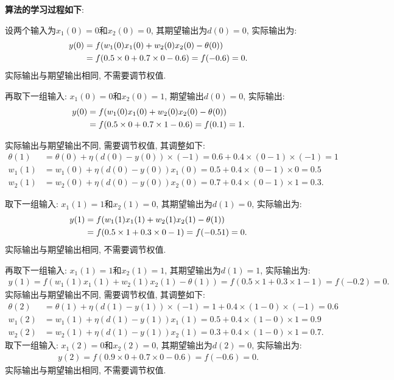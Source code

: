 \textbf{算法的学习过程如下}:

设两个输入为$x_1 (0)=0$和$x_2 (0)=0$, 其期望输出为$d (0)=0$, 实际输出为:
\begin{align*}
y (0)&=f (w_1 (0)x_1 (0)+ w_2 (0)x_2 (0)-\theta (0))\notag\\
     &=f (0.5\times 0+0.7\times 0-0.6)=f (-0.6)=0.
\end{align*}
实际输出与期望输出相同, 不需要调节权值.

再取下一组输入: $x_1 (0)=0$和$x_2 (0)=1$,  期望输出$d (0)=0$, 实际输出:
\begin{align*}
y (0)&=f (w_1 (0) x_1 (0)+ w_2 (0) x_2 (0)-\theta (0))\notag\\
    &=f (0.5\times 0+0.7\times 1-0.6)=f (0.1)=1.
\end{align*}

实际输出与期望输出不同, 需要调节权值, 其调整如下:
\begin{align*}
\theta (1)&=\theta (0)+\eta (d (0)- y (0))\times (-1)=0.6+0.4\times (0-1)\times (-1)=1\\
w_1 (1)&=w_1 (0)+\eta (d (0)- y (0))x_1 (0)=0.5+0.4\times (0-1)\times 0=0.5\\
w_2 (1)&=w_2 (0)+\eta (d (0)- y (0))x_2 (0)=0.7+0.4\times (0-1)\times 1=0.3.
\end{align*}

取下一组输入: $x_1 (1)=1$和$x_2 (1)=0$, 其期望输出为$d (1)=0$, 实际输出为:
\begin{align*}
y (1)&=f (w_1 (1) x_1 (1)+ w_2 (1) x_2 (1)-\theta (1))\notag\\
    &=f (0.5\times 1+0.3\times 0-1)=f (-0.51)=0.
\end{align*}
实际输出与期望输出相同, 不需要调节权值.

再取下一组输入: $x_1 (1)=1$和$x_2 (1)=1$, 其期望输出为$d (1)=1$, 实际输出为:
\begin{align*}
  y (1)=f (w_1 (1) x_1 (1)+ w_2 (1) x_2 (1)-\theta (1))=f (0.5\times 1+0.3\times 1-1)=f (-0.2)=0.
\end{align*}
实际输出与期望输出不同, 需要调节权值, 其调整如下:
\begin{align*}
\theta (2)&=\theta (1)+\eta (d (1)- y (1))\times (-1)=1+0.4\times (1-0)\times (-1)=0.6\\
    w_1 (2)&=w_1 (1)+\eta (d (1)- y (1))x_1 (1)=0.5+0.4\times (1-0)\times 1=0.9\\
    w_2 (2)&=w_2 (1)+\eta (d (1)- y (1))x_2 (1)=0.3+0.4\times (1-0)\times 1=0.7.
\end{align*}
取下一组输入: $x_1 (2)=0$和$x_2 (2)=0$, 其期望输出为$d (2)=0$, 实际输出为:
\begin{align*}
    y (2)=f (0.9\times 0+0.7\times 0-0.6)=f (-0.6)=0.
\end{align*}
实际输出与期望输出相同, 不需要调节权值.

